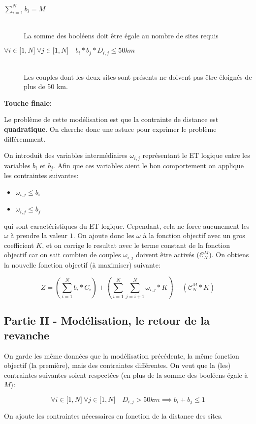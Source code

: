 \documentclass[a4paper]{article}
\begin{document}
\begin{description}
    \item[$\sum\limits_{i = 1}^{N}b_{i} = M$] \hfill \\
        La somme des booléens doit être égale au nombre de sites requis
    \item[$\forall i \in \lbrack1, N\rbrack\  \forall j \in \lbrack1, N\rbrack\quad  b_{i} * b_{j} * D_{i, j} \le 50km$] \hfill \\
        Les couples dont les deux sites sont présents ne doivent pas être
        éloignés de plus de 50 km.
\end{description}

\textbf{Touche finale:}

Le problème de cette modélisation est que la contrainte de distance est \textbf{quadratique}.
On cherche donc une astuce pour exprimer le problème différemment.

On introduit des variables intermédiaires $\omega_{i, j}$ représentant le ET logique
entre les variables $b_{i}$ et $b_{j}$. Afin que ces variables aient le bon comportement
on applique les contraintes suivantes:

\begin{itemize}
    \item[] $\omega_{i, j} \le b_{i}$
    \item[] $\omega_{i, j} \le b_{j}$
\end{itemize}

qui sont caractéristiques du ET logique. Cependant, cela ne force aucunement les
$\omega$ à prendre la valeur $1$. On ajoute donc les $\omega$ à la fonction
objectif avec un gros coefficient $K$, et on corrige le resultat avec le terme constant de la fonction objectif car
on sait combien de couples $\omega_{i, j}$ doivent être activés ($\mathcal{C}_{N}^{M}$).
On obtiens la nouvelle fonction objectif (à maximiser) suivante:

$$
Z = \left(\sum\limits_{i = 1}^{N}b_{i} * C_{i}\right)
+ \left(\sum\limits_{i = 1}^{N}\sum\limits_{j = i + 1}^{N} \omega_{i, j} * K\right)
- \left(\mathcal{C}_{N}^{M} * K\right)
$$

\subsection*{Partie II - Modélisation, le retour de la revanche}

On garde les même données que la modélisation précédente, la même fonction
objectif (la première), mais des contraintes différentes. On veut que la (les)
contraintes suivantes soient respectées (en plus de la somme des booléens
égale à $M$):

$$
\forall i \in \lbrack1, N\rbrack\  \forall j \in \lbrack1, N\rbrack 
\quad D_{i, j} > 50km \implies b_{i} + b_{j} \le 1
$$

On ajoute les contraintes nécessaires en fonction de la distance des sites.
\end{document}
